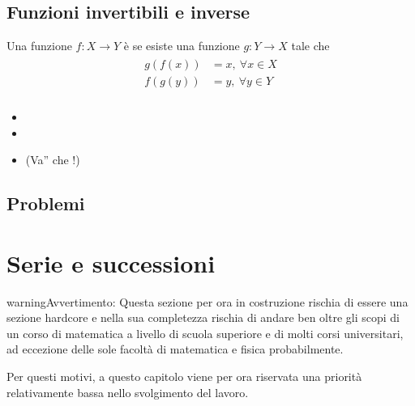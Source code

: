 \documentclass[letterpaper,10pt,italian]{jupyterBook}
\begin{document}
\section{Funzioni invertibili e inverse}
\label{\detokenize{ch/precalculus/real-functions:funzioni-invertibili-e-inverse}}\label{\detokenize{ch/precalculus/real-functions:math-hs-precalculus-real-functions-inverse}}
\sphinxAtStartPar
Una funzione \(f: X \rightarrow Y\) è  se esiste una funzione \(g: Y \rightarrow X\) tale che
\begin{equation*}
\begin{split}\begin{aligned}
  g\left( f(x) \right) & = x , \ \forall x \in X \\
  f\left( g(y) \right) & = y , \ \forall y \in Y \\
\end{aligned}\end{split}
\end{equation*}\begin{itemize}
\item {} 
\sphinxAtStartPar
{}

\item {} 
\sphinxAtStartPar
{}

\item {} 
\sphinxAtStartPar
{} (Va” che {\hyperref[\detokenize{ch/logics:logics-syllogism}]{}}!)

\end{itemize}


\section{Problemi}
\label{\detokenize{ch/precalculus/real-functions:problemi}}\label{\detokenize{ch/precalculus/real-functions:math-hs-precalculus-real-functions-problems}}
\sphinxAtStartPar
{}

\sphinxstepscope




\chapter{Serie e successioni}
\label{\detokenize{ch/series:serie-e-successioni}}\label{\detokenize{ch/series:math-hs-series}}\label{\detokenize{ch/series::doc}}
\begin{sphinxadmonition}{warning}{Avvertimento:}
\sphinxAtStartPar
Questa sezione \sphinxhyphen{} per ora in costruzione \sphinxhyphen{} rischia di essere una sezione hard\sphinxhyphen{}core e nella sua completezza rischia di andare ben oltre gli scopi di un corso di matematica a livello di scuola superiore e di molti corsi universitari, ad eccezione delle sole facoltà di matematica e fisica probabilmente.

\sphinxAtStartPar
Per questi motivi, a questo capitolo viene per ora riservata una priorità relativamente bassa nello svolgimento del lavoro.
\end{sphinxadmonition}
\end{document}
